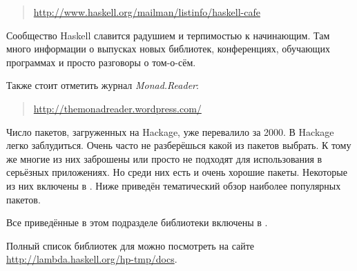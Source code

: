\begin{quote}
\url{http://www.haskell.org/mailman/listinfo/haskell-cafe}
\end{quote}

Сообщество Haskell славится радушием и терпимостью 
к начинающим. Там много информации о выпусках новых библиотек,
конференциях, обучающих программах и просто разговоры о том-о-сём.

Также стоит отметить журнал \emph{Monad.Reader}:

\begin{quote}
\url{http://themonadreader.wordpress.com/}
\end{quote}

\newpage


Число пакетов, загруженных на Hackage, уже перевалило за 
2000. В Hackage легко заблудиться. 
Очень часто не разберёшься какой из пакетов
выбрать. К тому же многие из них заброшены или просто 
не подходят для использования в серьёзных приложениях. 
Но среди них есть и очень хорошие пакеты. Некоторые
из них включены в . 
Ниже приведён тематический обзор наиболее популярных пакетов.


Все приведённые в этом подразделе библиотеки включены
в .

Полный список библиотек для 
можно посмотреть на сайте \url{http://lambda.haskell.org/hp-tmp/docs}.

